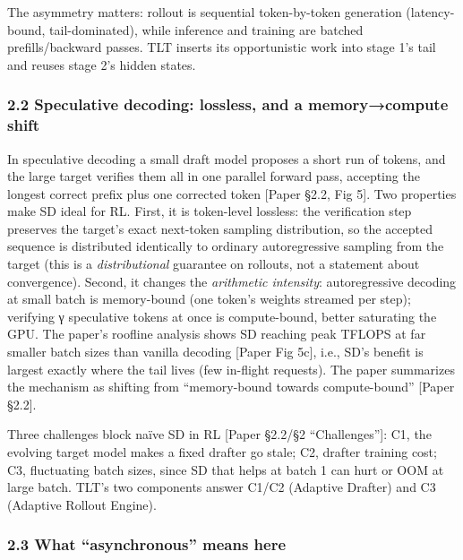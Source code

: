\documentclass[
  11pt,
  letterpaper,
]{article}
\begin{document}
The asymmetry matters: rollout is sequential token-by-token generation
(latency-bound, tail-dominated), while inference and training are
batched prefills/backward passes. TLT inserts its opportunistic work
into stage 1's tail and reuses stage 2's hidden states.

\subsubsection{2.2 Speculative decoding: lossless, and a memory→compute
shift}\label{speculative-decoding-lossless-and-a-memorycompute-shift}

In speculative decoding a small draft model proposes a short run of
tokens, and the large target verifies them all in one parallel forward
pass, accepting the longest correct prefix plus one corrected token
{[}Paper §2.2, Fig 5{]}. Two properties make SD ideal for RL. First, it
is token-level lossless: the verification step preserves the target's
exact next-token sampling distribution, so the accepted sequence is
distributed identically to ordinary autoregressive sampling from the
target (this is a \emph{distributional} guarantee on rollouts, not a
statement about convergence). Second, it changes the \emph{arithmetic
intensity}: autoregressive decoding at small batch is memory-bound (one
token's weights streamed per step); verifying γ speculative tokens at
once is compute-bound, better saturating the GPU. The paper's roofline
analysis shows SD reaching peak TFLOPS at far smaller batch sizes than
vanilla decoding {[}Paper Fig 5c{]}, i.e., SD's benefit is largest
exactly where the tail lives (few in-flight requests). The paper
summarizes the mechanism as shifting from ``memory-bound towards
compute-bound'' {[}Paper §2.2{]}.

Three challenges block naïve SD in RL {[}Paper §2.2/§2
``Challenges''{]}: C1, the evolving target model makes a fixed drafter
go stale; C2, drafter training cost; C3, fluctuating batch sizes, since
SD that helps at batch 1 can hurt or OOM at large batch. TLT's two
components answer C1/C2 (Adaptive Drafter) and C3 (Adaptive Rollout
Engine).

\subsubsection{2.3 What ``asynchronous'' means
here}\label{what-asynchronous-means-here}
\end{document}
